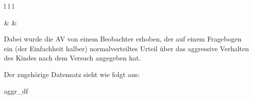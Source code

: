 \documentclass[
]{book}
\newenvironment{Shaded}{\begin{snugshade}}{\end{snugshade}}
\newcommand{\NormalTok}[1]{#1}
\begin{document}
\begin{table}[ht]
\begin{centerbox}
\begin{threeparttable}
\begin{tabular}{l l l}

 &
 &
 \tabularnewline[-0.5pt]


\end{tabular}
\end{threeparttable}\par\end{centerbox}

\end{table}
 

Dabei wurde die AV von einem Beobachter erhoben, der auf einem Fragebogen ein (der Einfachheit halber) normalverteiltes Urteil über das aggressive Verhalten des Kindes nach dem Versuch angegeben hat.

Der zugehörige Datensatz sieht wie folgt aus:

\begin{Shaded}
\begin{Highlighting}[]
\NormalTok{aggr\_df}
\end{Highlighting}
\end{Shaded}

 
  \providecommand{\huxb}[2]{\arrayrulecolor[RGB]{#1}\global\arrayrulewidth=#2pt}
  \providecommand{\huxvb}[2]{\color[RGB]{#1}\vrule width #2pt}
  \providecommand{\huxtpad}[1]{\rule{0pt}{#1}}
  \providecommand{\huxbpad}[1]{\rule[-#1]{0pt}{#1}}
\end{document}
